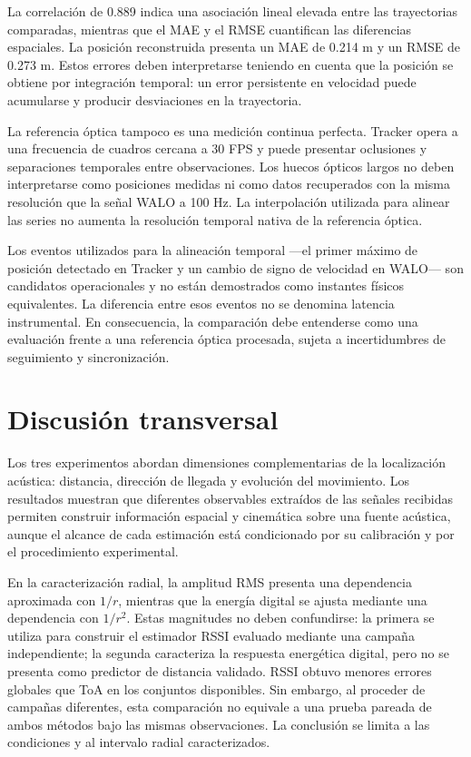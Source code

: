 La correlación de 0.889 indica una asociación lineal elevada
entre las trayectorias comparadas, mientras que el MAE y
el RMSE cuantifican las diferencias espaciales. La posición
reconstruida presenta un MAE de 0.214 m y un RMSE de
0.273 m. Estos errores deben interpretarse teniendo en
cuenta que la posición se obtiene por integración temporal:
un error persistente en velocidad puede acumularse y
producir desviaciones en la trayectoria.

La referencia óptica tampoco es una medición continua
perfecta. Tracker opera a una frecuencia de cuadros cercana
a 30 FPS y puede presentar oclusiones y separaciones
temporales entre observaciones. Los huecos ópticos largos
no deben interpretarse como posiciones medidas ni como
datos recuperados con la misma resolución que la señal
WALO a 100 Hz. La interpolación utilizada para alinear
las series no aumenta la resolución temporal nativa de
la referencia óptica.

Los eventos utilizados para la alineación temporal —el
primer máximo de posición detectado en Tracker y un cambio
de signo de velocidad en WALO— son candidatos operacionales
y no están demostrados como instantes físicos equivalentes.
La diferencia entre esos eventos no se denomina latencia
instrumental. En consecuencia, la comparación debe
entenderse como una evaluación frente a una referencia
óptica procesada, sujeta a incertidumbres de seguimiento
y sincronización.

\section{Discusión transversal}
\label{sec:discusion_transversal}

Los tres experimentos abordan dimensiones complementarias
de la localización acústica: distancia, dirección de llegada
y evolución del movimiento. Los resultados muestran que
diferentes observables extraídos de las señales recibidas
permiten construir información espacial y cinemática sobre
una fuente acústica, aunque el alcance de cada estimación
está condicionado por su calibración y por el procedimiento
experimental.

En la caracterización radial, la amplitud RMS presenta una
dependencia aproximada con $1/r$, mientras que la energía
digital se ajusta mediante una dependencia con $1/r^2$.
Estas magnitudes no deben confundirse: la primera se utiliza
para construir el estimador RSSI evaluado mediante una
campaña independiente; la segunda caracteriza la respuesta
energética digital, pero no se presenta como predictor de
distancia validado. RSSI obtuvo menores errores globales
que ToA en los conjuntos disponibles. Sin embargo, al
proceder de campañas diferentes, esta comparación no
equivale a una prueba pareada de ambos métodos bajo las
mismas observaciones. La conclusión se limita a las
condiciones y al intervalo radial caracterizados.

